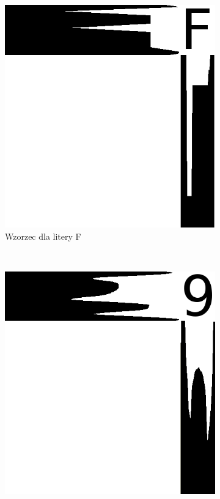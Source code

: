 \begin{figure}
  \centering
  \begin{subfigure}[b]{0.42\textwidth}
    \includegraphics[width=\textwidth]{img/rzut-wzorzec-F}
    \caption{Wzorzec dla litery F}
    \label{fig:rzut_wzorzec_F}
  \end{subfigure}
  ~
  \begin{subfigure}[b]{0.42\textwidth}
    \includegraphics[width=\textwidth]{img/rzut-wzorzec-9}

\end{subfigure}
\end{figure}
